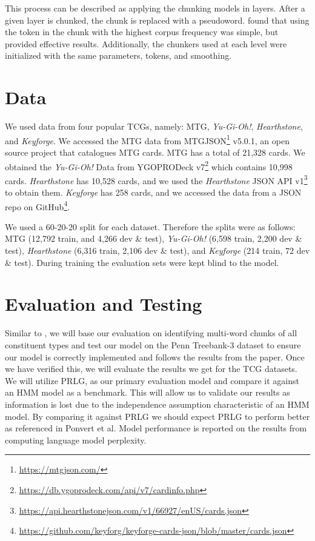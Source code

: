 \documentclass[11pt,a4paper]{article}
\begin{document}
This process can be described as applying the chunking models in layers. After a given layer is chunked, the chunk is replaced with a pseudoword. \citet{ponvert-etal-2011-simple} found that using the token in the chunk with the highest corpus frequency was simple, but provided effective results. Additionally, the chunkers used at each level were initialized with the same parameters, tokens, and smoothing.

\section{Data}
We used data from four popular TCGs, namely: MTG, \emph{Yu-Gi-Oh!}, \emph{Hearthstone}, and \emph{Keyforge}. We accessed the MTG data from MTGJSON\footnote{\url{https://mtgjson.com/}} v5.0.1, an open source project that catalogues MTG cards. MTG has a total of 21,328 cards. We obtained the \emph{Yu-Gi-Oh!} Data from YGOPRODeck v7\footnote{\url{https://db.ygoprodeck.com/api/v7/cardinfo.php}} which contains 10,998 cards. \emph{Hearthstone} has 10,528 cards, and we used the \emph{Hearthstone} JSON API v1\footnote{\url{https://api.hearthstonejson.com/v1/66927/enUS/cards.json}} to obtain them. \emph{Keyforge} has 258 cards, and we accessed the data from a JSON repo on GitHub\footnote{\url{https://github.com/keyforg/keyforge-cards-json/blob/master/cards.json}}.

We used a 60-20-20 split for each dataset. Therefore the splits were as follows: MTG (12,792 train, and 4,266 dev \& test), \emph{Yu-Gi-Oh!} (6,598 train, 2,200 dev \& test), \emph{Hearthstone} (6,316 train, 2,106 dev \& test), and \emph{Keyforge} (214 train, 72 dev \& test). During training the evaluation sets were kept blind to the model.

\section{Evaluation and Testing}
Similar to \citet{ponvert-etal-2011-simple}, we will base our evaluation on identifying multi-word chunks of all constituent types and test our model on the Penn Treebank-3 dataset to ensure our model is correctly implemented and follows the results from the paper. Once we have verified this, we will evaluate the results we get for the TCG datasets. We will utilize PRLG, as our primary evaluation model and compare it against an HMM model as a benchmark. This will allow us to validate our results as information is lost due to the independence assumption characteristic of an HMM model. By comparing it against PRLG we should expect PRLG to perform better as referenced in Ponvert et al. Model performance is reported on the results from computing language model perplexity. 
\end{document}
